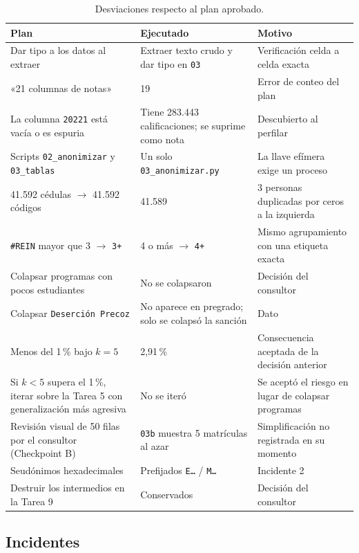 \documentclass[11pt,a4paper,twoside,twocolumn]{article}
\newcommand{\cod}[1]{\nolinkurl{#1}}
\newcommand{\cab}[1]{\textcolor{ustaAzul}{\textbf{#1}}}
\begin{document}
\begin{table}[tp]
\centering
\caption{Desviaciones respecto al plan aprobado.}
\label{tab:desviaciones}
\footnotesize
\setlength{\tabcolsep}{4pt}
\begin{tabularx}{\textwidth}{@{}L L L@{}}
\toprule
\cab{Plan} & \cab{Ejecutado} & \cab{Motivo} \\
\midrule
Dar tipo a los datos al extraer & Extraer texto crudo y dar tipo en \cod{03} & Verificación celda a celda exacta \\
«21 columnas de notas» & 19 & Error de conteo del plan \\
La columna \cod{20221} está vacía o es espuria & Tiene 283.443 calificaciones; se suprime como nota & Descubierto al perfilar \\
Scripts \cod{02_anonimizar} y \cod{03_tablas} & Un solo \cod{03_anonimizar.py} & La llave efímera exige un proceso \\
41.592 cédulas $\to$ 41.592 códigos & 41.589 & 3 personas duplicadas por ceros a la izquierda \\
\texttt{\#REIN} mayor que 3 $\to$ \cod{3+} & 4 o más $\to$ \cod{4+} & Mismo agrupamiento con una etiqueta exacta \\
Colapsar programas con pocos estudiantes & No se colapsaron & Decisión del consultor \\
Colapsar \texttt{Deserción Precoz} & No aparece en pregrado; solo se colapsó la sanción & Dato \\
Menos del 1\,\% bajo $k = 5$ & 2,91\,\% & Consecuencia aceptada de la decisión anterior \\
Si $k < 5$ supera el 1\,\%, iterar sobre la Tarea 5 con generalización más agresiva & No se iteró & Se aceptó el riesgo en lugar de colapsar programas \\
Revisión visual de 50 filas por el consultor (Checkpoint B) & \cod{03b} muestra 5 matrículas al azar & Simplificación no registrada en su momento \\
Seudónimos hexadecimales & Prefijados \texttt{E…} / \texttt{M…} & Incidente 2 \\
Destruir los intermedios en la Tarea 9 & Conservados & Decisión del consultor \\
\bottomrule
\end{tabularx}
\end{table}

\subsection{Incidentes}
\end{document}
